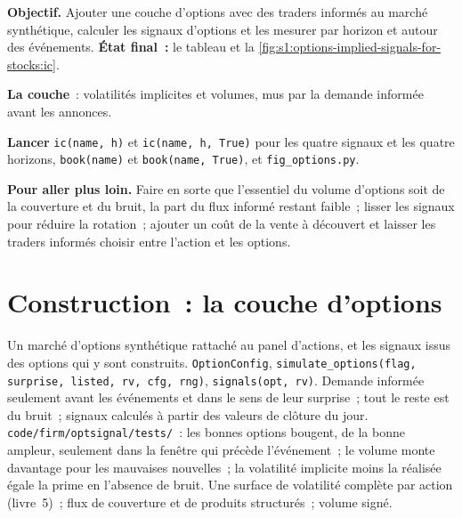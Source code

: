 \begin{tutorial}
\textbf{Objectif.} Ajouter une couche d'options avec des traders informés au marché synthétique, calculer les signaux d'options et les mesurer par horizon et autour des
événements. \textbf{État final~:} le tableau et la \cref{fig:s1:options-implied-signals-for-stocks:ic}.
\begin{tutsteps}
\item \textbf{La couche}~: volatilités implicites et volumes, mus par la demande informée avant les annonces.
\label{lst:s1:options-implied-signals-for-stocks:layer}
\item \textbf{Lancer} \texttt{ic(name, h)} et \texttt{ic(name, h, True)} pour les quatre signaux et les quatre horizons, \texttt{book(name)} et
\texttt{book(name, True)}, et \texttt{fig\_options.py}.
\end{tutsteps}
\textbf{Pour aller plus loin.} Faire en sorte que l'essentiel du volume d'options soit de la couverture et du bruit, la part du flux informé restant faible~; lisser les signaux pour réduire la rotation~; ajouter un
coût de la vente à découvert et laisser les traders informés choisir entre l'action et les options.
\end{tutorial}

\section{Construction~: la couche d'options}\label{bld:s1:options-implied-signals-for-stocks:optsignal}

\begin{build}
 Un marché d'options synthétique rattaché au panel d'actions, et les signaux issus des options qui y sont construits.
 \texttt{OptionConfig}, \texttt{simulate\_options(flag, surprise, listed, rv, cfg, rng)}, \texttt{signals(opt, rv)}.
 Demande informée seulement avant les événements et dans le sens de leur surprise~; tout le reste est du bruit~; signaux calculés à partir des valeurs de clôture du jour.
 \texttt{code/firm/optsignal/tests/}~: les bonnes options bougent, de la bonne ampleur, seulement dans la fenêtre qui précède l'événement~; le volume monte
davantage pour les mauvaises nouvelles~; la volatilité implicite moins la réalisée égale la prime en l'absence de bruit.
 Une surface de volatilité complète par action (livre~5)~; flux de couverture et de produits structurés~; volume signé.
\end{build}

